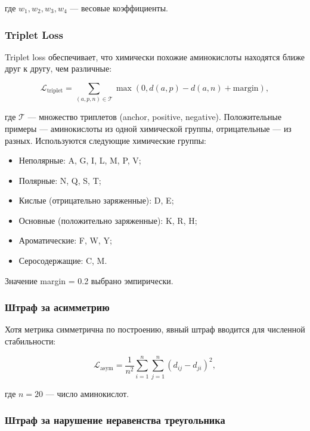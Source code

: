 \documentclass[12pt]{article}
\begin{document}
где $w_1, w_2, w_3, w_4$ --- весовые коэффициенты.

\subsubsection{Triplet Loss}

Triplet loss обеспечивает, что химически похожие аминокислоты находятся ближе друг к другу, чем различные:

\begin{equation}
\mathcal{L}_{\text{triplet}} = \sum_{(a, p, n) \in \mathcal{T}} \max\left(0, d(a, p) - d(a, n) + \text{margin}\right),
\label{eq:triplet}
\end{equation}

где $\mathcal{T}$ --- множество триплетов (anchor, positive, negative). Положительные примеры --- аминокислоты из одной химической группы, отрицательные --- из разных. Используются следующие химические группы:
\begin{itemize}
    \item Неполярные: A, G, I, L, M, P, V;
    \item Полярные: N, Q, S, T;
    \item Кислые (отрицательно заряженные): D, E;
    \item Основные (положительно заряженные): K, R, H;
    \item Ароматические: F, W, Y;
    \item Серосодержащие: C, M.
\end{itemize}

Значение margin = 0.2 выбрано эмпирически.

\subsubsection{Штраф за асимметрию}

Хотя метрика симметрична по построению, явный штраф вводится для численной стабильности:

\begin{equation}
\mathcal{L}_{\text{asym}} = \frac{1}{n^2} \sum_{i=1}^{n} \sum_{j=1}^{n} (d_{ij} - d_{ji})^2,
\label{eq:asym}
\end{equation}

где $n = 20$ --- число аминокислот.

\subsubsection{Штраф за нарушение неравенства треугольника}
\end{document}
